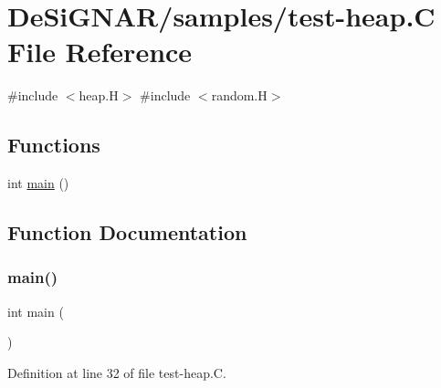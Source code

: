 \hypertarget{test-heap_8_c}{}\section{De\+Si\+G\+N\+A\+R/samples/test-\/heap.C File Reference}
\label{test-heap_8_c}
{\ttfamily \#include $<$heap.\+H$>$}\newline
{\ttfamily \#include $<$random.\+H$>$}\newline
\subsection*{Functions}
\begin{DoxyCompactItemize}
\item 
int \hyperlink{test-heap_8_c_ae66f6b31b5ad750f1fe042a706a4e3d4}{main} ()
\end{DoxyCompactItemize}


\subsection{Function Documentation}
\mbox{\label{test-heap_8_c_ae66f6b31b5ad750f1fe042a706a4e3d4}} 
\subsubsection{\texorpdfstring{main()}{main()}}
{\footnotesize\ttfamily int main (\begin{DoxyParamCaption}{ }\end{DoxyParamCaption})}



Definition at line 32 of file test-\/heap.\+C.

